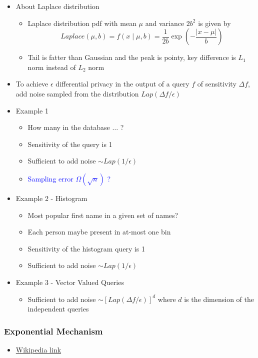 \documentclass{article}
\newcommand{\blue}[1]{\textcolor{blue}{#1}}
\begin{document}
\begin{itemize}
    \item About Laplace distribution
        \begin{itemize}
            \item Laplace distribution pdf with mean $\mu$ and variance $2b^2$ is given by
                $$Laplace(\mu,b) = f(x\mid \mu ,b) ={\frac  {1}{2b}}\exp \left(-{\frac  {|x-\mu |}{b}}\right)$$
            \item Tail is fatter than Gaussian and the peak is pointy, key difference is $L_1$ norm instead of $L_2$ norm
        \end{itemize}
    \item To achieve $\epsilon$ differential privacy in the output of a query $f$ of sensitivity $\Delta f$, add noise sampled from the distribution $Lap(\Delta f / \epsilon)$
    \item Example 1
        \begin{itemize}
            \item How many in the database $\dots$ ?
            \item Sensitivity of the query is 1
            \item Sufficient to add noise $\sim Lap(1/\epsilon)$
            \item \blue{Sampling error $\Omega(\sqrt{n})$ ?}
        \end{itemize}
    \item Example 2 - Histogram
        \begin{itemize}
            \item Most popular first name in a given set of names?
            \item Each person maybe present in at-most one bin
            \item Sensitivity of the histogram query is 1
            \item Sufficient to add noise $\sim Lap(1/\epsilon)$
        \end{itemize}
    \item Example 3 - Vector Valued Queries
        \begin{itemize}
            \item Sufficient to add noise $\sim [Lap(\Delta f/\epsilon)]^d$ where $d$ is the dimension of the independent queries
        \end{itemize}
\end{itemize}

\subsubsection{Exponential Mechanism}

\begin{itemize}
    \item \href{https://en.wikipedia.org/wiki/Exponential_mechanism_(differential_privacy)}{Wikipedia link}
\end{itemize}
\end{document}
